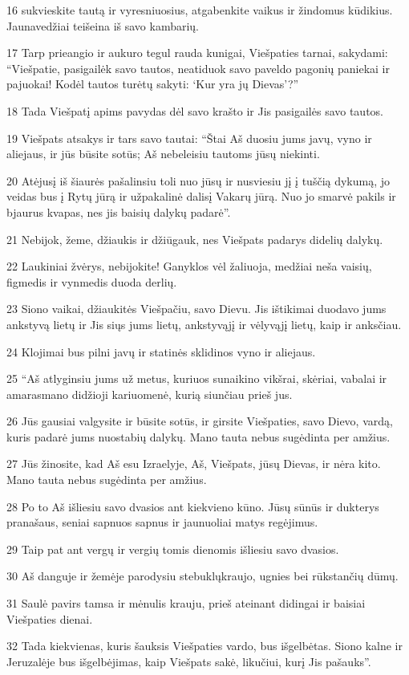 \par 16 sukvieskite tautą ir vyresniuosius, atgabenkite vaikus ir žindomus kūdikius. Jaunavedžiai teišeina iš savo kambarių. 
\par 17 Tarp prieangio ir aukuro tegul rauda kunigai, Viešpaties tarnai, sakydami: “Viešpatie, pasigailėk savo tautos, neatiduok savo paveldo pagonių paniekai ir pajuokai! Kodėl tautos turėtų sakyti: ‘Kur yra jų Dievas’?” 
\par 18 Tada Viešpatį apims pavydas dėl savo krašto ir Jis pasigailės savo tautos. 
\par 19 Viešpats atsakys ir tars savo tautai: “Štai Aš duosiu jums javų, vyno ir aliejaus, ir jūs būsite sotūs; Aš nebeleisiu tautoms jūsų niekinti. 
\par 20 Atėjusį iš šiaurės pašalinsiu toli nuo jūsų ir nusviesiu jį į tuščią dykumą, jo veidas bus į Rytų jūrą ir užpakalinė dalis­į Vakarų jūrą. Nuo jo smarvė pakils ir bjaurus kvapas, nes jis baisių dalykų padarė”. 
\par 21 Nebijok, žeme, džiaukis ir džiūgauk, nes Viešpats padarys didelių dalykų. 
\par 22 Laukiniai žvėrys, nebijokite! Ganyklos vėl žaliuoja, medžiai neša vaisių, figmedis ir vynmedis duoda derlių. 
\par 23 Siono vaikai, džiaukitės Viešpačiu, savo Dievu. Jis ištikimai duodavo jums ankstyvą lietų ir Jis siųs jums lietų, ankstyvąjį ir vėlyvąjį lietų, kaip ir anksčiau. 
\par 24 Klojimai bus pilni javų ir statinės sklidinos vyno ir aliejaus. 
\par 25 “Aš atlyginsiu jums už metus, kuriuos sunaikino vikšrai, skėriai, vabalai ir amaras­mano didžioji kariuomenė, kurią siunčiau prieš jus. 
\par 26 Jūs gausiai valgysite ir būsite sotūs, ir girsite Viešpaties, savo Dievo, vardą, kuris padarė jums nuostabių dalykų. Mano tauta nebus sugėdinta per amžius. 
\par 27 Jūs žinosite, kad Aš esu Izraelyje, Aš, Viešpats, jūsų Dievas, ir nėra kito. Mano tauta nebus sugėdinta per amžius. 
\par 28 Po to Aš išliesiu savo dvasios ant kiekvieno kūno. Jūsų sūnūs ir dukterys pranašaus, seniai sapnuos sapnus ir jaunuoliai matys regėjimus. 
\par 29 Taip pat ant vergų ir vergių tomis dienomis išliesiu savo dvasios. 
\par 30 Aš danguje ir žemėje parodysiu stebuklų­kraujo, ugnies bei rūkstančių dūmų. 
\par 31 Saulė pavirs tamsa ir mėnulis­ krauju, prieš ateinant didingai ir baisiai Viešpaties dienai. 
\par 32 Tada kiekvienas, kuris šauksis Viešpaties vardo, bus išgelbėtas. Siono kalne ir Jeruzalėje bus išgelbėjimas, kaip Viešpats sakė, likučiui, kurį Jis pašauks”.



